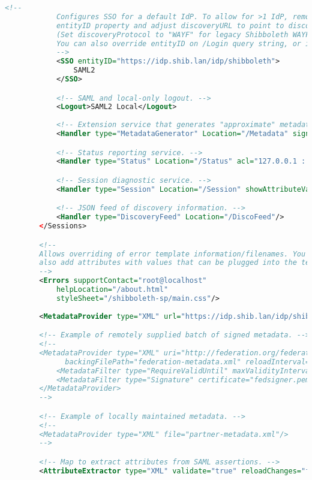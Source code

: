 \begin{lstlisting}[language=xml]
            <!--
            Configures SSO for a default IdP. To allow for >1 IdP, remove
            entityID property and adjust discoveryURL to point to discovery service.
            (Set discoveryProtocol to "WAYF" for legacy Shibboleth WAYF support.)
            You can also override entityID on /Login query string, or in RequestMap/htaccess.
            -->
            <SSO entityID="https://idp.shib.lan/idp/shibboleth">
                SAML2 
            </SSO>

            <!-- SAML and local-only logout. -->
            <Logout>SAML2 Local</Logout>
            
            <!-- Extension service that generates "approximate" metadata based on SP configuration. -->
            <Handler type="MetadataGenerator" Location="/Metadata" signing="false"/>

            <!-- Status reporting service. -->
            <Handler type="Status" Location="/Status" acl="127.0.0.1 ::1"/>

            <!-- Session diagnostic service. -->
            <Handler type="Session" Location="/Session" showAttributeValues="true"/>

            <!-- JSON feed of discovery information. -->
            <Handler type="DiscoveryFeed" Location="/DiscoFeed"/>
        </Sessions>

        <!--
        Allows overriding of error template information/filenames. You can
        also add attributes with values that can be plugged into the templates.
        -->
        <Errors supportContact="root@localhost"
            helpLocation="/about.html"
            styleSheet="/shibboleth-sp/main.css"/>
        
        <MetadataProvider type="XML" url="https://idp.shib.lan/idp/shibboleth" />

        <!-- Example of remotely supplied batch of signed metadata. -->
        <!--
        <MetadataProvider type="XML" uri="http://federation.org/federation-metadata.xml"
              backingFilePath="federation-metadata.xml" reloadInterval="7200">
            <MetadataFilter type="RequireValidUntil" maxValidityInterval="2419200"/>
            <MetadataFilter type="Signature" certificate="fedsigner.pem"/>
        </MetadataProvider>
        -->

        <!-- Example of locally maintained metadata. -->
        <!--
        <MetadataProvider type="XML" file="partner-metadata.xml"/>
        -->

        <!-- Map to extract attributes from SAML assertions. -->
        <AttributeExtractor type="XML" validate="true" reloadChanges="false" path="attribute-map.xml"/>
        

\end{lstlisting}
